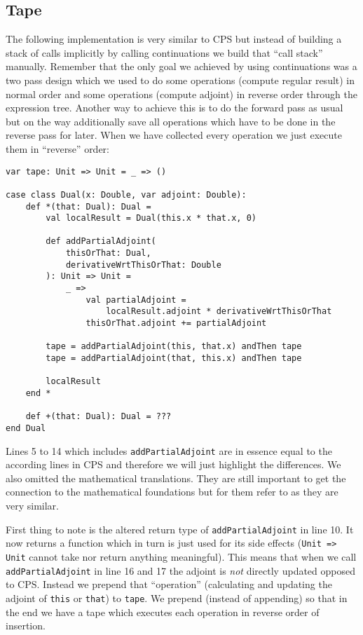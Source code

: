 \subsection{Tape}

The following implementation is very similar to CPS but instead of building a stack of calls implicitly by calling continuations we build that ``call stack'' manually. Remember that the only goal we achieved by using continuations was a two pass design which we used to do some operations (compute regular result) in normal order and some operations (compute adjoint) in reverse order through the expression tree. Another way to achieve this is to do the forward pass as usual but on the way additionally save all operations which have to be done in the reverse pass for later. When we have collected every operation we just execute them in ``reverse'' order:
\begin{lstlisting}[mathescape=true]
var tape: Unit => Unit = _ => ()

case class Dual(x: Double, var adjoint: Double):
    def *(that: Dual): Dual =
        val localResult = Dual(this.x * that.x, 0)

        def addPartialAdjoint(
            thisOrThat: Dual,
            derivativeWrtThisOrThat: Double
        ): Unit => Unit =
            _ =>
                val partialAdjoint = 
                    localResult.adjoint * derivativeWrtThisOrThat
                thisOrThat.adjoint += partialAdjoint

        tape = addPartialAdjoint(this, that.x) andThen tape
        tape = addPartialAdjoint(that, this.x) andThen tape

        localResult
    end *

    def +(that: Dual): Dual = ???
end Dual
\end{lstlisting}
Lines 5 to 14 which includes \lstinline{addPartialAdjoint} are in essence equal to the according lines in CPS and therefore we will just highlight the differences. We also omitted the mathematical translations. They are still important to get the connection to the mathematical foundations but for them refer to  as they are very similar.

First thing to note is the altered return type of \lstinline{addPartialAdjoint} in line 10. It now returns a function which in turn is just used for its side effects (\lstinline{Unit => Unit} cannot take nor return anything meaningful). This means that when we call \lstinline{addPartialAdjoint} in line 16 and 17 the adjoint is \emph{not} directly updated opposed to CPS. Instead we prepend that ``operation'' (calculating and updating the adjoint of \lstinline{this} or \lstinline{that}) to \lstinline{tape}. We prepend (instead of appending) so that in the end we have a tape which executes each operation in reverse order of insertion. 

